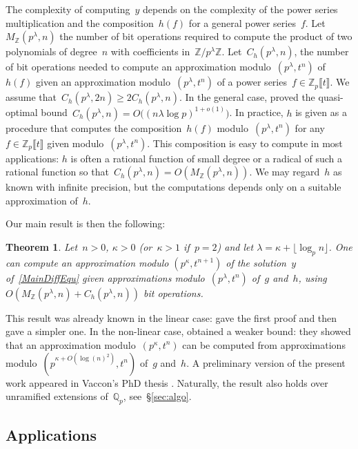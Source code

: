 \documentclass{sig-alternate}
\newtheorem{theo}{Theorem}
\theoremstyle{definition}
\theoremstyle{remark}
\newcommand{\Z}{\mathbb{Z}}
\newcommand{\Q}{\mathbb{Q}}
\newcommand{\Qp}{\Q_p}
\newcommand\Zpt{\mathbb{Z}_p \llbracket t \rrbracket}
\def\geq{\geqslant}
\begin{document}
The complexity of computing~$y$ depends on the complexity of the power series
multiplication and the composition~$h(f)$ for a general power series~$f$.
Let~$M_\Z(p^\lambda, n)$ the number of bit operations required to compute the
product of two polynomials of degree~$n$ with coefficients
in~$\Z/p^{\lambda}\Z$.  Let~$C_h(p^\lambda, n)$, the number of bit operations
needed to compute an approximation modulo~$(p^\lambda, t^n)$ of~$h(f)$ given an
approximation modulo~$(p^\lambda, t^n)$ of a power series~$f \in \Zpt$.  We
assume that~$C_h(p^\lambda, 2n) \geq 2 C_h(p^\lambda, n)$.  In the general
case, \textcite{KedUma11} proved the quasi-optimal bound~$C_h(p^\lambda, n) =
O\big( (n \lambda \log p)^{1+o(1)}\big)$.  In practice, $h$ is given as a
procedure that computes the composition~$h(f)$ modulo~$(p^\lambda, t^n)$ for
any~$f \in \Zpt$ given modulo~$(p^\lambda, t^n)$.  This
composition is easy to compute in most applications: $h$ is often a rational function of small degree or a
radical of such a rational function so that~$C_h(p^\lambda, n) =
O(M_\Z(p^\lambda,n))$.  We may regard~$h$ as known with infinite precision, but
the computations depends only on a suitable approximation of~$h$.


Our main result is then the following:
\begin{theo} \label{MainTheorem}
  Let~$n > 0$, $\kappa > 0$ (or~$\kappa > 1$ if~$p=2$) and let $\lambda = \kappa + \lfloor \log_p n \rfloor$.
  One can
  compute an approximation modulo $(p^{\kappa}, t^{n+1})$ of the solution~$y$ of~\eqref{MainDiffEqu}
  given approximations modulo~$(p^{\lambda}, t^{n})$ of~$g$ and~$h$,
  using $O\left(M_\Z(p^\lambda,n) + C_h(p^\lambda, n) \right)$ bit operations.
\end{theo}

This result was already known in the linear case: \textcite{BosGonPer05} gave
the first proof and then \textcite{Grenet:2015} gave a simpler one.  In the
non-linear case, \textcite{LerSir08} obtained a weaker bound: they showed that
an approximation modulo~$(p^{\kappa}, t^n)$ can be computed from approximations
modulo~$(p^{\kappa + O(\log(n)^2)}, t^n)$ of~$g$ and~$h$.  A preliminary
version of the present work appeared in Vaccon's PhD thesis \parencite{Vac15}.
Naturally, the result also holds over unramified extensions of~$\Qp$,
see~\S\ref{sec:algo}. 


\subsection{Applications}
\end{document}
